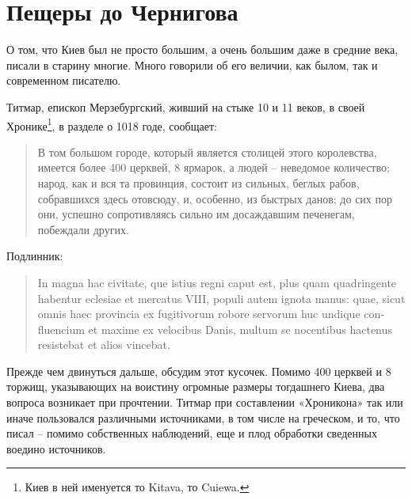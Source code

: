 \chapter{Пещеры до Чернигова}

О том, что Киев был не просто большим, а очень большим даже в средние века, писали в старину многие. Много говорили об его величии, как былом, так и современном писателю.

Титмар, епископ Мерзебургский, живший на стыке 10 и 11 веков, в своей Хронике\footnote{Киев в ней именуется то Kitava, то Cuiewa.}, в разделе о 1018 годе, сообщает\cite{titmar01}:


\begin{quotation}
В том большом городе, который является столицей этого королевства, имеется более 400 церквей, 8 ярмарок, а людей – неведомое количество; народ, как и вся та провинция, состоит из сильных, беглых рабов, собравшихся здесь отовсюду, и, особенно, из быстрых данов; до сих пор они, успешно сопротивляясь сильно им досаждавшим печенегам, побеждали других.
\end{quotation}

Подлинник\cite[стр. 258]{titmar00}:

\begin{quotation}
\begin{otherlanguage}{latin}
In magna hac civitate, que istius regni caput est, plus quam quadringente habentur eclesiae et mercatus VIII, populi autem ignota manus: quae, sicut omnis haec provincia ex fugitivorum robore servorum huc undique confluencium et maxime ex velocibus Danis, multum se nocentibus hactenus resistebat et alios vincebat.
\end{otherlanguage}
\end{quotation}

Прежде чем двинуться дальше, обсудим этот кусочек. Помимо 400 церквей и 8 торжищ, указывающих на воистину огромные размеры тогдашнего Киева, два вопроса возникает при прочтении. Титмар при составлении «Хроникона» так или иначе пользовался различными источниками, в том числе на греческом, и то, что писал – помимо собственных наблюдений, еще и плод обработки сведенных воедино источников.

